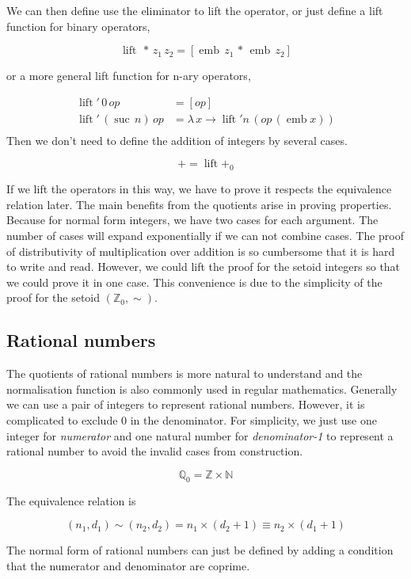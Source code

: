 \documentclass[envcountsame]{llncs}
\newcommand{\N}{\mathbb{N}}
\newcommand{\Q}{\mathbb{Q}}
\newcommand{\Z}{\mathbb{Z}}
\providecommand{\class}[1]{[#1]}
\DeclareMathOperator{\emb}{emb}
\DeclareMathOperator{\lift}{lift}
\DeclareMathOperator{\suc}{suc\,}
\begin{document}
We can then define use the eliminator to lift the operator, or just define a lift function for binary operators,

$$ \lift \,* \,z_1 \,z_2 = \class{\emb \,z_1 \,*\,\emb \,z_2}$$

or a more general lift function for n-ary operators,



\begin{align*}
\lift' \,0 \,op &= \class{op}\\
\lift' \,(\suc n) \,op &= \lambda \,x \to \lift' n \,(op \,(\emb x))\\
\end{align*}
Then we don't need to define the addition of integers by several cases.

$$+ = \lift +_0$$

If we lift the operators in this way, we have to prove it respects the equivalence relation later. The main benefits from the quotients arise in proving properties. Because for normal form integers, we have two cases for each argument. The number of cases will expand exponentially if we can not combine cases. The proof of distributivity of multiplication over addition is so cumbersome
that it is hard to write and read. However, we could lift the proof for the setoid integers so that we could prove it in one case. This convenience is due to the simplicity of the proof for the setoid $(\Z_0,\sim)$. 

\subsection{Rational numbers}

The quotients of rational numbers is more natural to understand and the normalisation function is also commonly used in regular mathematics. Generally we can use a pair of integers to represent rational numbers. However, it is complicated to exclude 0 in the denominator. For simplicity, we just use one integer for \emph{numerator} and one natural number for \emph{denominator-1} to represent a rational number to avoid the invalid cases from construction. 

$$\Q_0 = \Z \times \N$$



The equivalence relation is

$$(n_1, d_1) \sim (n_2, d_2) = n_1 \times (d_2 + 1) \equiv n_2 \times (d_1 + 1) $$

The normal form of rational numbers can just be defined by adding a condition that the numerator and denominator are coprime.
\end{document}
